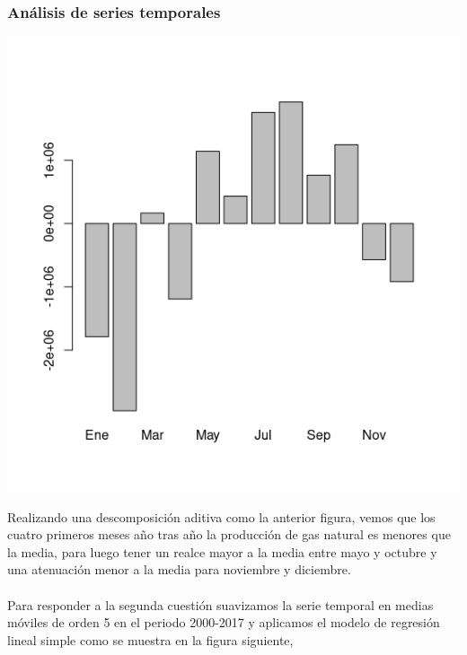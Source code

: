 \begin{multicols}{2}
\subsubsection*{Análisis de series temporales}
\begin{center}
    \includegraphics[scale = 0.6]{codigoFuente/tareas/estadistica/imagenes/descom.png}
\end{center}
Realizando una descomposición aditiva como la anterior figura,
vemos que los cuatro primeros meses año tras año la producción de gas natural es menores que la media, para luego tener un realce mayor a la media entre mayo y octubre y una atenuación menor a la media para noviembre y diciembre. \\\\

Para responder a la segunda cuestión suavizamos la serie temporal en medias móviles de orden 5 en el periodo 2000-2017 y aplicamos el modelo de regresión lineal simple como se muestra en la figura siguiente,


\end{multicols}
